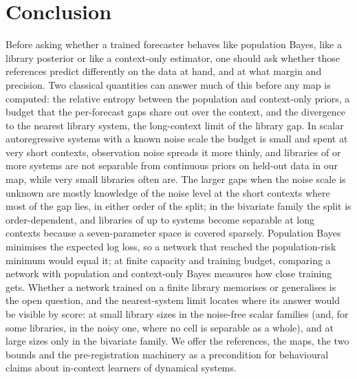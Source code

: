 \section{Conclusion}
Before asking whether a trained forecaster behaves like population Bayes, like a library posterior or like a context-only
estimator, one should ask whether those references predict differently on the data at hand, and at what margin and
precision. Two classical quantities can answer much of this before any map is computed: the relative entropy between the
population and context-only priors, a budget that the per-forecast gaps share out over the context, and the divergence to the
nearest library system, the long-context limit of the library gap. In scalar autoregressive systems with a known noise scale
the budget is small and spent at very short contexts, observation noise spreads it more thinly, and libraries of
\LibBigKOneA or more systems are not separable from continuous priors on held-out data in our map, while very small libraries
often are. The larger gaps when the noise scale is unknown are mostly knowledge of the noise level at the short contexts
where most of the gap lies, in either order of the split; in the bivariate family the split is order-dependent, and libraries of up to \KThousand systems become separable at long
contexts because a seven-parameter space is covered sparsely. Population Bayes minimises the expected log loss, so a network that reached the
population-risk minimum would equal it; at finite capacity and training budget, comparing a network with population and
context-only Bayes measures how close training gets. Whether a network trained on a finite library memorises or generalises
is the open question, and the nearest-system limit locates where its answer would be visible by score: at small library sizes in
the noise-free scalar families (and, for some libraries, in the noisy one, where no cell is separable as a whole), and at
large sizes only in the bivariate family. We offer the references, the maps, the two bounds
and the pre-registration machinery as a precondition for behavioural claims about in-context learners of dynamical systems.
